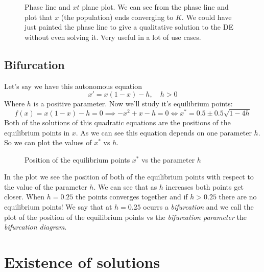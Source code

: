 \documentclass[../ode.tex]{subfiles}
\begin{document}
    \begin{figure}[ht]
        \centering
        \caption{Phase line and $xt$ plane plot. We can see from the phase line and plot that $x$ (the population) ends converging to $K$.
        We could have just painted the phase line to give a qualitative solution to the DE without even solving it. Very useful in a lot of use cases.}
        \label{fig:phase-plot}
    \end{figure}
    



    \subsection{\sffamily Bifurcation}
    Let's say we have this autonomous equation
    \begin{equation*}
        x' = x(1-x) - h, \quad h>0
    \end{equation*}
    Where $h$ is a positive parameter. Now we'll study it's equilibrium points:
    \begin{equation*}
        f(x)=x(1-x)-h=0 \implies -x^{2}+x-h=0 \iff x^{*}= 0.5\pm 0.5 \sqrt{1-4h} 
    \end{equation*}
    Both of the solutions of this quadratic equations are the positions of the equilibrium points in $x$. As we can see this
    equation depends on one parameter $h$. So we can plot the values of $x^{*}$ vs $h$. 

    \begin{figure}
        \centering
        
        \caption{Position of the equilibrium points $x^{*}$ vs the parameter $h$}
    \end{figure}

    
    In the plot we see the position of both of the equilibrium points with respect to the value of the parameter $h$. We can see
    that as $h$ increases both points get closer. When $h=0.25$ the points converges together and if $h>0.25$ there are no
    equilibrium points! We say that at $h=0.25$ ocurrs a \emph{bifurcation} and we call the plot of the position of the
    equilibrium points vs the \emph{bifurcation parameter} the \emph{bifurcation diagram}.
    
    
    \section{\sffamily Existence of solutions}
\end{document}
